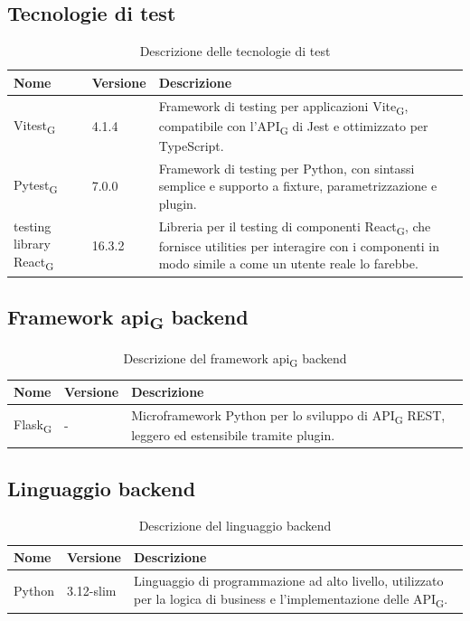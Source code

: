 \documentclass[11pt,a4paper]{article}
\newcommand{\gls}[1]{#1\textsubscript{G}}
\begin{document}
\subsection{Tecnologie di test}
\begin{table}[H]
    \centering
    \begin{tabular}{|p{}|p{}|p{}|}
        \hline
        \textbf{Nome} & \textbf{Versione} & \textbf{Descrizione} \\
        \hline
        \gls{Vitest} & 4.1.4 & Framework di testing per applicazioni \gls{Vite}, compatibile con l'\gls{API} di Jest e ottimizzato per TypeScript. \\
        \hline
        \gls{Pytest} & 7.0.0 & Framework di testing per Python, con sintassi semplice e supporto a fixture, parametrizzazione e plugin. \\
        \hline
        testing library \gls{React} & 16.3.2 & Libreria per il testing di componenti \gls{React}, che fornisce utilities per interagire con i componenti in modo simile a come un utente reale lo farebbe. \\
        \hline
    \end{tabular}
    \caption{Descrizione delle tecnologie di test}
    \label{tab:tecnologie_test}
\end{table}

\subsection{Framework \gls{api} backend}
\begin{table}[H]
    \centering
    \begin{tabular}{|p{}|p{}|p{}|}
        \hline
        \textbf{Nome} & \textbf{Versione} & \textbf{Descrizione} \\
        \hline
        \gls{Flask} & - & Microframework Python per lo sviluppo di \gls{API} REST, leggero ed estensibile tramite plugin. \\
        \hline
    \end{tabular}
    \caption{Descrizione del framework \gls{api} backend}
    \label{tab:api_backend}
\end{table}

\subsection{Linguaggio backend}
\begin{table}[H]
    \centering
    \begin{tabular}{|p{}|p{}|p{}|}
        \hline
        \textbf{Nome} & \textbf{Versione} & \textbf{Descrizione} \\
        \hline
        Python & 3.12-slim & Linguaggio di programmazione ad alto livello, utilizzato per la logica di business e l'implementazione delle \gls{API}. \\
        \hline
    \end{tabular}
    \caption{Descrizione del linguaggio backend}
    \label{tab:linguaggio_backend}
\end{table}
\end{document}
